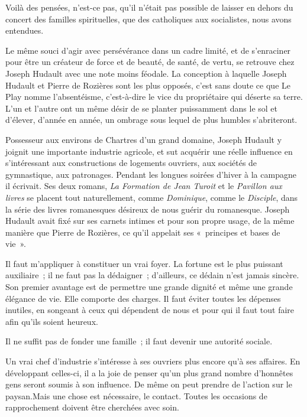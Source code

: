 \documentclass[french,twoside]{book} %
\newenvironment{quoteblock}%
  {\begin{quoting}}
  {\end{quoting}}
\newenvironment{quotebar}{%
    \def\FrameCommand{{\color{rubric!10!}\vrule width 0.5em} \hspace{0.9em}}%
    \def\OuterFrameSep{\itemsep} %
    \MakeFramed {\advance\hsize-\width \FrameRestore}
  }%
  {%
    \endMakeFramed
  }
\renewenvironment{quoteblock}%
  {%
    \savenotes
    \setstretch{0.9}
    \normalfont
    \begin{quotebar}
  }
  {%
    \end{quotebar}
    \spewnotes
  }
\begin{document}
\noindent Voilà des pensées, n’est-ce pas, qu’il n’était pas possible de laisser en dehors du concert des familles spirituelles, que des catholiques aux socialistes, nous avons entendues.‌\par
Le même souci d’agir avec persévérance dans un cadre limité, et de s’enraciner pour être un créateur de force et de beauté, de santé, de vertu, se retrouve chez Joseph Hudault avec une note moins féodale. La conception à laquelle Joseph Hudault et Pierre de Rozières sont les plus opposés, c’est sans doute ce que Le Play nomme l’absentéisme, c’est-à-dire le vice du propriétaire qui déserte sa terre. L’un et l’autre ont un même désir de se planter puissamment dans le sol et d’élever, d’année en année, un ombrage sous lequel de plus humbles s’abriteront.‌\par
Possesseur aux environs de Chartres d’un grand domaine, Joseph Hudault y joignit une importante industrie agricole, et sut acquérir une réelle influence en s’intéressant aux constructions de logements ouvriers, aux sociétés de gymnastique, aux patronages. Pendant les longues soirées d’hiver à la campagne il écrivait. Ses deux romans, {\itshape La Formation de Jean Turoit} et le {\itshape Pavillon aux livres} se placent tout naturellement, comme {\itshape Dominique}, comme le {\itshape Disciple}, dans la série des livres romanesques désireux de nous guérir du romanesque. Joseph Hudault avait fixé sur ses carnets intimes et pour son propre usage, de la même manière que Pierre de Rozières, ce qu’il appelait ses « principes et bases de vie ».‌\par

\begin{quoteblock}
 \noindent Il faut m’appliquer à constituer un vrai foyer. La fortune est le plus puissant auxiliaire ; il ne faut pas la dédaigner ; d’ailleurs, ce dédain n’est jamais sincère. Son premier avantage est de permettre une grande dignité et même une grande élégance de vie. Elle comporte des charges. Il faut éviter toutes les dépenses inutiles, en songeant à ceux qui dépendent de nous et pour qui il faut tout faire afin qu’ils soient heureux.‌\par
 Il ne suffit pas de fonder une famille ; il faut devenir une autorité sociale.‌\par
 Un vrai chef d’industrie s’intéresse à ses ouvriers plus encore qu’à ses affaires. En développant celles-ci, il a la joie de penser qu’un plus grand nombre d’honnêtes gens seront soumis à son influence. De même on peut prendre de l’action sur le paysan.Mais une chose est nécessaire, le contact. Toutes les occasions de rapprochement doivent être cherchées avec soin.‌
 \end{quoteblock}
\end{document}

